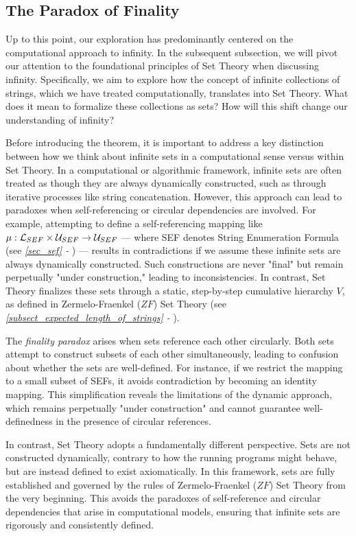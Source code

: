 \subsection{The Paradox of Finality}

Up to this point, our exploration has predominantly centered on the computational approach to infinity. In the subsequent subsection, we will pivot our attention to the foundational principles of Set Theory when discussing infinity. Specifically, we aim to explore how the concept of infinite collections of strings, which we have treated computationally, translates into Set Theory. What does it mean to formalize these collections as sets? How will this shift change our understanding of infinity?

Before introducing the theorem, it is important to address a key distinction between how we think about infinite sets in a computational sense versus within Set Theory. In a computational or algorithmic framework, infinite sets are often treated as though they are always dynamically constructed, such as through iterative processes like string concatenation. However, this approach can lead to paradoxes when self-referencing or circular dependencies are involved. For example, attempting to define a self-referencing mapping like $\mu: \mathcal{L}_{SEF} \times \mathcal{U}_{SEF} \to \mathcal{U}_{SEF}$ — where SEF denotes String Enumeration Formula (see \textit{\ref{sec_sef} - }) — results in contradictions if we assume these infinite sets are always dynamically constructed. Such constructions are never "final" but remain perpetually "under construction," leading to inconsistencies. In contrast, Set Theory finalizes these sets through a static, step-by-step cumulative hierarchy $V$, as defined in Zermelo-Fraenkel ($ZF$) Set Theory (see \textit{\ref{subsect_expected_length_of_strings} - }).

The \textit{finality paradox} arises when sets reference each other circularly. Both sets attempt to construct subsets of each other simultaneously, leading to confusion about whether the sets are well-defined. For instance, if we restrict the mapping to a small subset of SEFs, it avoids contradiction by becoming an identity mapping. This simplification reveals the limitations of the dynamic approach, which remains perpetually "under construction" and cannot guarantee well-definedness in the presence of circular references.

In contrast, Set Theory adopts a fundamentally different perspective. Sets are not constructed dynamically, contrary to how the running programs might behave, but are instead defined to exist axiomatically. In this framework, sets are fully established and governed by the rules of Zermelo-Fraenkel ($ZF$) Set Theory from the very beginning. This avoids the paradoxes of self-reference and circular dependencies that arise in computational models, ensuring that infinite sets are rigorously and consistently defined.

